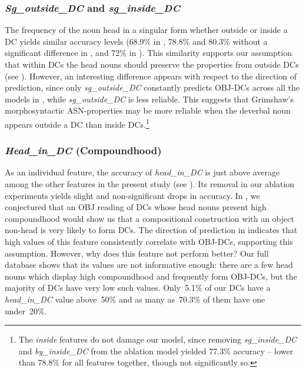 \documentclass[output=paper]{langsci/langscibook}
\begin{document}
\subsubsection{\textit{Sg\_outside\_DC} and \textit{sg\_inside\_DC}}
The frequency of the noun head in a singular form whether outside or inside a DC yields similar accuracy levels (68.9\% in , 78.8\% and 80.3\% without a significant difference in , and 72\% in ). This similarity supports our assumption that within DCs the head nouns should preserve the properties from outside DCs   {(see )}. However, an interesting difference appears with respect to the direction of prediction, since only \textit{sg\_outside\_DC} constantly predicts OBJ-DCs across all the models in , while \textit{sg\_outside\_DC} is less reliable. This suggests that Grimshaw's morphosyntactic ASN-properties may be more reliable when the deverbal noun appears outside a DC than inside DCs.\footnote{ {The \textit{inside} features do not damage our model,} since removing \textit{sg\_inside\_DC} and \textit{by\_inside\_DC} from the ablation model yielded 77.3\% accuracy -- lower than 78.8\% for all features together, though not significantly so.} 


\subsubsection{\textit{Head\_in\_DC} (Compoundhood)} 
As an individual feature, the accuracy of \textit{head\_in\_DC} is just above average among the other features in the present study (see ). Its removal in our ablation experiments  yields  slight and non-significant drops in accuracy. In , we conjectured that an OBJ reading of DCs whose head nouns present high compoundhood would show us that a compositional construction with an object non-head is very likely to form DCs. The  direction of prediction in  indicates that high values of this feature consistently correlate with OBJ-DCs, supporting this assumption. However, why does this feature not perform better? Our full database shows that its values are not informative enough: there are a few head nouns which display high compoundhood and frequently form OBJ-DCs, but the majority of DCs  have very low such values. Only~5.1\% of our DCs have a \textit{head\_in\_DC} value above~50\% and as many as~70.3\% of them have one under~20\%. 
\end{document}

